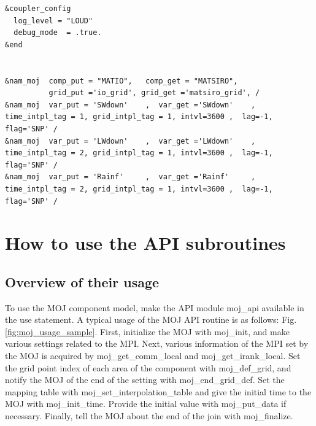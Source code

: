 \documentclass[11pt,a4paper]{report}
\newcommand{\figref}[1]{Fig. \ref{#1}}
\begin{document}
\begin{lstlisting}[caption=Example of MOJ configuration, label=list:moj_namelist_sample]
&coupler_config
  log_level = "LOUD"
  debug_mode  = .true.
&end 


&nam_moj  comp_put = "MATIO",   comp_get = "MATSIRO",
          grid_put ='io_grid', grid_get ='matsiro_grid', /
&nam_moj  var_put = 'SWdown'    ,  var_get ='SWdown'    , time_intpl_tag = 1, grid_intpl_tag = 1, intvl=3600 ,  lag=-1, flag='SNP' /
&nam_moj  var_put = 'LWdown'    ,  var_get ='LWdown'    , time_intpl_tag = 2, grid_intpl_tag = 1, intvl=3600 ,  lag=-1, flag='SNP' /
&nam_moj  var_put = 'Rainf'     ,  var_get ='Rainf'     , time_intpl_tag = 2, grid_intpl_tag = 1, intvl=3600 ,  lag=-1, flag='SNP' /
\end{lstlisting}


\chapter{How to use the API subroutines}
\section{Overview of their usage}
To use the MOJ component model, make the API module moj\_api available in the use statement. 
A typical usage of the MOJ API routine is as follows: \figref{fig:moj_usage_sample}. 
First, initialize the MOJ with moj\_init, and make various settings related to the MPI. 
Next, various information of the MPI set by the MOJ is acquired by moj\_get\_comm\_local and moj\_get\_irank\_local. 
Set the grid point index of each area of the component with moj\_def\_grid, and notify the MOJ of the end of the setting with moj\_end\_grid\_def. 
Set the mapping table with moj\_set\_interpolation\_table and give the initial time to the MOJ with moj\_init\_time. 
Provide the initial value with moj\_put\_data if necessary. 
Finally, tell the MOJ about the end of the join with moj\_finalize.
\end{document}
